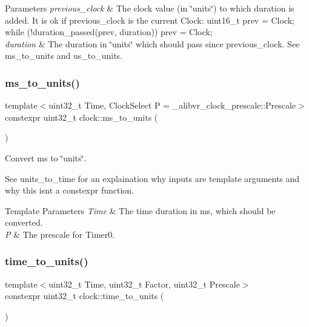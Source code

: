 \begin{DoxyParams}{Parameters}
{\em previous\+\_\+clock} & The clock value (in \char`\"{}units\char`\"{}) to which duration is added. It is ok if previous\+\_\+clock is the current Clock\+: {\ttfamily uint16\+\_\+t prev = Clock; while (!duration\+\_\+passed(prev, duration)) prev = Clock;} \\
\hline
{\em duration} & The duration in \char`\"{}units\char`\"{} which should pass since previous\+\_\+clock. See ms\+\_\+to\+\_\+units and us\+\_\+to\+\_\+units. \\
\hline
\end{DoxyParams}
\hypertarget{namespaceclock_ae159a2e83f7b30eeafe3d5be8a3f5ef6}{}\label{namespaceclock_ae159a2e83f7b30eeafe3d5be8a3f5ef6} 
\subsubsection{\texorpdfstring{ms\+\_\+to\+\_\+units()}{ms\_to\_units()}}
{\footnotesize\ttfamily template$<$uint32\+\_\+t Time, Clock\+Select P = \+\_\+alibvr\+\_\+clock\+\_\+prescale\+::\+Prescale$>$ \\
constexpr uint32\+\_\+t clock\+::ms\+\_\+to\+\_\+units (\begin{DoxyParamCaption}{ }\end{DoxyParamCaption})\hspace{0.3cm}{\ttfamily [inline]}}



Convert ms to \char`\"{}units\char`\"{}. 

See units\+\_\+to\+\_\+time for an explaination why inputs are template arguments and why this isn\textquotesingle{}t a constexpr function.


\begin{DoxyTemplParams}{Template Parameters}
{\em Time} & The time duration in ms, which should be converted. \\
\hline
{\em P} & The prescale for {\ttfamily Timer0}. \\
\hline
\end{DoxyTemplParams}
\hypertarget{namespaceclock_ac6b5f264784ea96fd8629fec0c0f7131}{}\label{namespaceclock_ac6b5f264784ea96fd8629fec0c0f7131} 
\subsubsection{\texorpdfstring{time\+\_\+to\+\_\+units()}{time\_to\_units()}}
{\footnotesize\ttfamily template$<$uint32\+\_\+t Time, uint32\+\_\+t Factor, uint32\+\_\+t Prescale$>$ \\
constexpr uint32\+\_\+t clock\+::time\+\_\+to\+\_\+units (\begin{DoxyParamCaption}{ }\end{DoxyParamCaption})}




